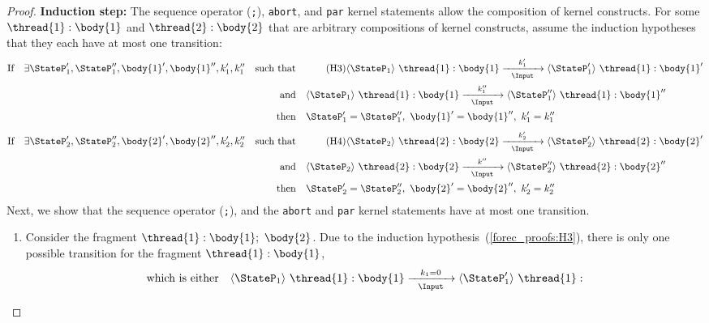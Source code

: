 \begin{proof}
	\textbf{Induction step:}
	The sequence operator (\verb$;$), \verb$abort$, and \verb$par$ 
	kernel statements allow the composition of kernel constructs.
	For some $\thread{1}:\body{1}$ and $\thread{2}:\body{2}$ that 
	are arbitrary compositions of kernel constructs, assume the 
	induction hypotheses that they each have at most one transition:
	\begin{align*}
		\text{If} \quad \exists \StateP_1', \StateP_1'', \body{1}', \body{1}'', k_1', k_1''
		\quad \text{such that} \quad
		&
		\tag{H3}
		\label{forec_proofs:H3}
		\langle \StateP_1 \rangle ~ \thread{1}:\body{1} 
			\xrightarrow[~~\Input~~]{k_1'} 
		\langle \StateP_1' \rangle ~ \thread{1}:\body{1}'					\\
		\text{and} \quad
		&
		\langle \StateP_1 \rangle ~ \thread{1}:\body{1} 
			\xrightarrow[~~\Input~~]{k_1''} 
		\langle \StateP_1'' \rangle ~ \thread{1}:\body{1}''					\\
		\text{then} \quad 
		&
		\StateP_1' = \StateP_1'', ~ \body{1}' = \body{1}'', ~ k_1' = k_1''
	\end{align*}
	\begin{align*}
		\text{If} \quad \exists \StateP_2', \StateP_2'', \body{2}', \body{2}'', k_2', k_2''
		\quad \text{such that} \quad
		&
		\tag{H4}
		\label{forec_proofs:H4}
		\langle \StateP_2 \rangle ~ \thread{2}:\body{2} 
			\xrightarrow[~~\Input~~]{k_2'} 
		\langle \StateP_2' \rangle ~ \thread{2}:\body{2}'				\\
		\text{and} \quad
		&
		\langle \StateP_2 \rangle ~ \thread{2}:\body{2} 
			\xrightarrow[~~\Input~~]{k''} 
		\langle \StateP_2'' \rangle ~ \thread{2}:\body{2}''				\\
		\text{then} \quad 
		&
		\StateP_2' = \StateP_2'', ~ \body{2}' = \body{2}'', ~ k_2' = k_2''
	\end{align*}
	Next, we show that the sequence operator (\verb$;$), and the 
	\verb$abort$ and \verb$par$ kernel statements have at most one transition.
	\begin{enumerate}
		\item Consider the fragment $\thread{1}:\body{1};~\body{2}$. 
			  Due to the induction hypothesis~(\ref{forec_proofs:H3}), there is only
			  one possible transition for the fragment $\thread{1}:\body{1}$,
			  \begin{align*}
			  	  \text{which is either} \quad
				  \langle \StateP_1 \rangle ~ \thread{1}:\body{1} 
				  &	\xrightarrow[~~\Input~~]{k_1 = 0} 
				  \langle \StateP_1' \rangle ~ \thread{1}:			\\

\end{align*}
\end{enumerate}
\end{proof}
